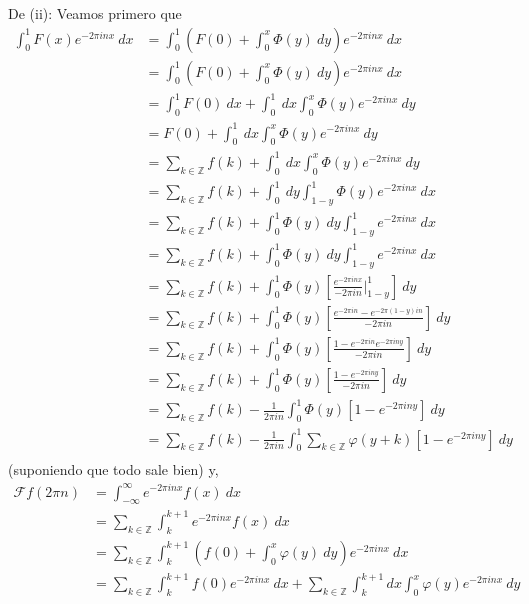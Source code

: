 \documentclass[12pt]{report}
\theoremstyle{largebreak}
\newcommand{\fou}[1]{\ensuremath{\mathcal{F}#1}}
\begin{document}
\begin{sol}
        De (ii): Veamos primero que
        \begin{equation*}
            \begin{split}
                \int_0^1 F(x)e^{ -2\pi inx}\:dx&=\int_0^1\left(F(0)+\int_0^x\Phi(y)\:dy\right)e^{ -2\pi inx}\:dx \\
                &=\int_0^1\left(F(0)+\int_0^x\Phi(y)\:dy\right)e^{ -2\pi inx}\:dx \\
                &=\int_0^1 F(0)\:dx+\int_0^1\:dx\int_0^x\Phi(y) e^{ -2\pi inx}\:dy \\
                &=F(0)+\int_0^1\:dx\int_0^x\Phi(y) e^{ -2\pi inx}\:dy\\
                &=\sum_{k\in\mathbb{Z}}f(k)+\int_0^1\:dx\int_0^x\Phi(y) e^{ -2\pi inx}\:dy\\
                &=\sum_{k\in\mathbb{Z}}f(k)+\int_0^1\:dy\int_{1-y}^1\Phi(y) e^{ -2\pi inx}\:dx\\
                &=\sum_{k\in\mathbb{Z}}f(k)+\int_0^1\Phi(y)\:dy\int_{1-y}^1 e^{ -2\pi inx}\:dx\\
                &=\sum_{k\in\mathbb{Z}}f(k)+\int_0^1\Phi(y)\:dy\int_{1-y}^1 e^{ -2\pi inx}\:dx\\
                &=\sum_{k\in\mathbb{Z}}f(k)+\int_0^1\Phi(y)\left[\frac{e^{ -2\pi inx}}{-2\pi in}\Big|_{1-y}^1\right]\:dy\\
                &=\sum_{k\in\mathbb{Z}}f(k)+\int_0^1\Phi(y)\left[\frac{e^{ -2\pi in}-e^{ -2\pi(1-y)in}}{-2\pi in}\right]\:dy\\
                &=\sum_{k\in\mathbb{Z}}f(k)+\int_0^1\Phi(y)\left[\frac{1-e^{ -2\pi in}e^{ -2\pi iny}}{-2\pi in}\right]\:dy\\
                &=\sum_{k\in\mathbb{Z}}f(k)+\int_0^1\Phi(y)\left[\frac{1-e^{ -2\pi iny}}{-2\pi in}\right]\:dy\\
                &=\sum_{k\in\mathbb{Z}}f(k)-\frac{1}{2\pi in}\int_0^1\Phi(y)\left[1-e^{-2\pi iny}\right]\:dy\\
                &=\sum_{k\in\mathbb{Z}}f(k)-\frac{1}{2\pi in}\int_0^1\sum_{ k\in\mathbb{Z}}\varphi(y+k)\left[1-e^{-2\pi iny}\right]\:dy\\
            \end{split}
        \end{equation*}
        (suponiendo que todo sale bien) y,
        \begin{equation*}
            \begin{split}
                \fou{f}(2\pi n)&=\int_{-\infty}^{\infty}e^{ -2\pi inx}f(x)\:dx\\
                &=\sum_{ k\in\mathbb{Z}}\int_{k}^{k+1}e^{ -2\pi inx}f(x)\:dx\\
                &=\sum_{ k\in\mathbb{Z}}\int_{k}^{k+1}\left(f(0)+\int_0^x\varphi(y)\:dy\right) e^{ -2\pi inx} \:dx\\
                &=\sum_{ k\in\mathbb{Z}}\int_{k}^{k+1}f(0)e^{ -2\pi inx}\:dx+\sum_{ k\in\mathbb{Z}}\int_{k}^{k+1}dx\int_0^x \varphi(y)e^{-2\pi inx}\:dy
            \end{split}
        \end{equation*}


\end{sol}
\end{document}
